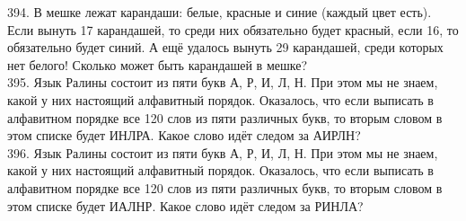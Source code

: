 394. В мешке лежат карандаши: белые, красные и синие (каждый цвет есть). Если вынуть 17 карандашей, то среди них обязательно будет красный, если 16, то обязательно будет синий. А ещё удалось вынуть 29 карандашей, среди которых нет белого! Сколько может быть карандашей в мешке?\\
395. Язык Ралины состоит из пяти букв А, Р, И, Л, Н. При этом мы не знаем, какой у них настоящий алфавитный порядок. Оказалось, что если выписать в алфавитном порядке все 120 слов из пяти различных букв, то вторым словом в этом списке будет ИНЛРА. Какое слово идёт следом за АИРЛН?\\
396. Язык Ралины состоит из пяти букв А, Р, И, Л, Н. При этом мы не знаем, какой у них настоящий алфавитный порядок. Оказалось, что если выписать в алфавитном порядке все 120 слов из пяти различных букв, то вторым словом в этом списке будет ИАЛНР. Какое слово идёт следом за РИНЛА?
